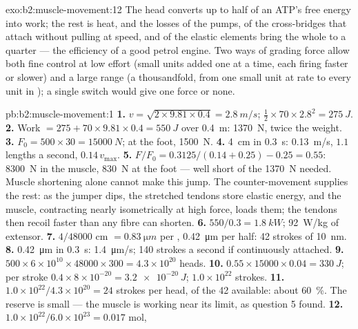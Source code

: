 \begin{solution}{exo:b2:muscle-movement:12}
The head converts up to half of an ATP's free energy into work;
the rest is heat, and the losses of the pumps, of the cross-bridges
that attach without pulling at speed, and of the elastic elements
bring the whole to a quarter --- the efficiency of a good petrol
engine. Two ways of grading force allow both fine control at low
effort (small units added one at a time, each firing faster or
slower) and a large range (a thousandfold, from one small unit at
 rate to every unit in ); a single switch would give
one force or none.
\end{solution}

\begin{solution}{pb:b2:muscle-movement:1}
\textbf{1.} $v = \sqrt{2\times 9.81\times 0.4} = \qty{2.8}{m/s}$;
$\tfrac12\times 70\times 2.8^{2} = \qty{275}{J}$.
\textbf{2.} Work $= 275 + 70\times 9.81\times 0.4 = \qty{550}{J}$ over
\qty{0.4}{m}: \qty{1370}{N}, twice the weight.
\textbf{3.} $F_0 = 500\times 30 = \qty{15000}{N}$; at the foot,
\qty{1500}{N}.
\textbf{4.} \qty{4}{cm} in \qty{0.3}{s}: \qty{0.13}{m/s}, $1.1$ lengths a
second, $0.14\,v_{\max}$.
\textbf{5.} $F/F_0 = 0.3125/(0.14 + 0.25) - 0.25 = 0.55$: \qty{8300}{N}
in the muscle, \qty{830}{N} at the foot --- well short of the
\qty{1370}{N} needed. Muscle shortening alone cannot make this jump.
The counter-movement supplies the rest: as the jumper dips, the
stretched tendons store elastic energy, and the muscle, contracting
nearly isometrically at high force, loads them; the tendons then
recoil faster than any fibre can shorten.
\textbf{6.} $550/0.3 = \qty{1.8}{kW}$; \qty{92}{W/kg} of extensor.
\textbf{7.} $4/\num{48000}$ cm $= \qty{0.83}{\micro m}$ per ,
\qty{0.42}{\micro m} per half: 42 strokes of \qty{10}{nm}.
\textbf{8.} \qty{0.42}{\micro m} in \qty{0.3}{s}: \qty{1.4}{\micro m/s};
140 strokes a second if continuously attached.
\textbf{9.} $500\times 6\times 10^{10}\times \num{48000}\times 300 =
4.3\times 10^{20}$ heads.
\textbf{10.} $0.55\times \num{15000}\times 0.04 = \qty{330}{J}$; per
stroke $0.4\times 8\times 10^{-20} = \qty{3.2e-20}{J}$; $1.0\times
10^{22}$ strokes.
\textbf{11.} $1.0\times 10^{22}/4.3\times 10^{20} = 24$ strokes per
head, of the 42 available: about \qty{60}{\%}. The reserve is
small --- the muscle is working near its limit, as question 5
found.
\textbf{12.} $1.0\times 10^{22}/6.0\times 10^{23} = 0.017$ mol,

\end{solution}
